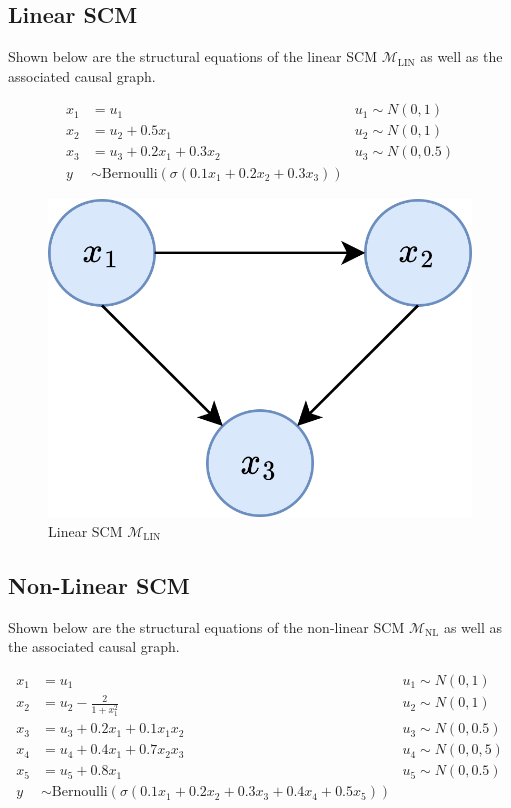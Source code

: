 \subsection{Linear SCM}

Shown below are the structural equations of the linear SCM $\mathcal{M}_{\text{LIN}}$ as well as the associated causal graph.

\begin{align}
	x_1 & = u_1 & u_1 \sim N(0,1) \\ \nonumber
	x_2 & = u_2 + 0.5x_1 & u_2 \sim N(0,1) \\ \nonumber
	x_3 & = u_3 + 0.2x_1 + 0.3x_2 & u_3 \sim N(0,0.5) \\ \nonumber
	y   & \sim \text{Bernoulli}(\sigma(0.1x_1 + 0.2x_2 + 0.3x_3))
\end{align}

\begin{figure}[!htb]
	\centering
	\includegraphics[width=0.4\linewidth]{images/draw.io/toy_scm.png}
	\caption{Linear SCM $\mathcal{M}_{\text{LIN}}$}
	\label{fig:simple_scm}
\end{figure}

\subsection{Non-Linear SCM}

Shown below are the structural equations of the non-linear SCM $\mathcal{M}_{\text{NL}}$ as well as the associated causal graph.

\begin{align}
	x_1 & = u_1 & u_1 \sim N(0,1) \\ \nonumber
	x_2 & = u_2 - \frac{2}{1 + x_1^2} & u_2 \sim N(0,1) \\ \nonumber
	x_3 & = u_3 + 0.2x_1 + 0.1x_1x_2 & u_3 \sim N(0,0.5) \\ \nonumber
	x_4 & = u_4 + 0.4x_1 + 0.7x_2x_3 & u_4 \sim N(0,0,5) \\ \nonumber
	x_5 & = u_5 + 0.8x_1 & u_5 \sim N(0,0.5) \\ \nonumber
	y   & \sim \text{Bernoulli}(\sigma(0.1x_1 + 0.2x_2 + 0.3x_3 + 0.4x_4 + 0.5x_5))
\end{align}

